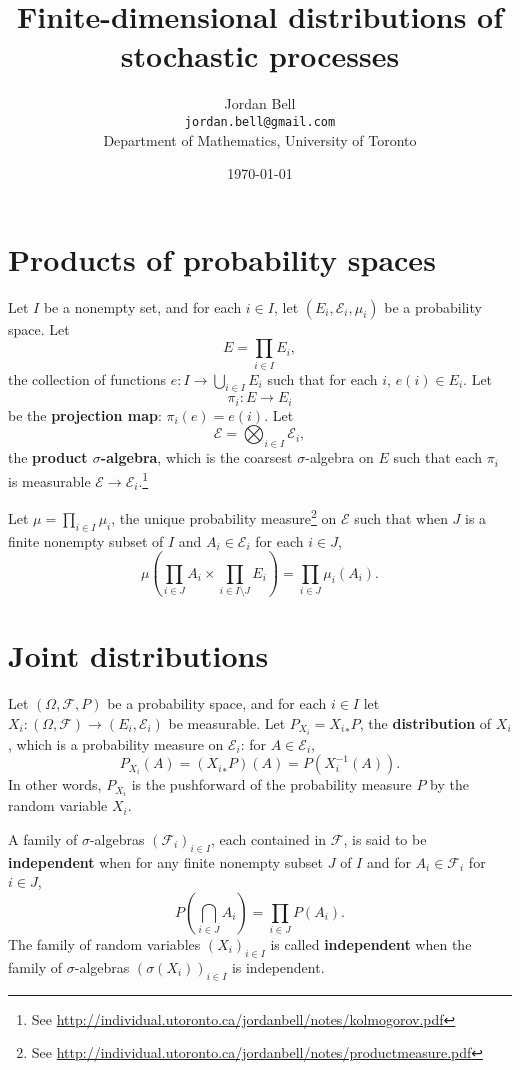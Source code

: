 \documentclass{article}
\theoremstyle{definition}
\begin{document}
\title{Finite-dimensional distributions of stochastic processes}
\author{Jordan Bell\\ \texttt{jordan.bell@gmail.com}\\Department of Mathematics, University of Toronto}
\date{\today}

\maketitle

\section{Products of probability spaces}
Let $I$ be a nonempty set,  and for each
$i \in I$, let $(E_i,\mathscr{E}_i,\mu_i)$ be a probability space.
Let
\[
E=\prod_{i \in I} E_i,
\]
the collection of functions
$e:I \to \bigcup_{i \in I} E_i$ such that for each $i$, $e(i) \in E_i$.
Let
\[
\pi_i:E \to E_i
\]
 be the \textbf{projection map}: $\pi_i(e) = e(i)$. 
Let
\[
\mathscr{E} = \bigotimes_{i \in I} \mathscr{E}_i,
\]
 the \textbf{product $\sigma$-algebra}, which is
the coarsest $\sigma$-algebra on $E$ such that each $\pi_i$ is measurable
$\mathscr{E} \to \mathscr{E}_i$.\footnote{See \url{http://individual.utoronto.ca/jordanbell/notes/kolmogorov.pdf}}

Let $\mu=\prod_{i \in I} \mu_i$, the unique probability measure\footnote{See \url{http://individual.utoronto.ca/jordanbell/notes/productmeasure.pdf}} on $\mathscr{E}$ such that when $J$ is a   finite nonempty subset of $I$
and $A_i \in \mathscr{E}_i$ for each $i \in J$,
\[
\mu\left( \prod_{i \in J} A_i \times \prod_{i \in I \setminus J} E_i \right) = \prod_{i \in J} \mu_i(A_i).
\]


\section{Joint distributions}
Let $(\Omega,\mathscr{F},P)$ be a probability space, and for each $i \in I$ let
$X_i:(\Omega,\mathscr{F}) \to (E_i,\mathscr{E}_i)$ be measurable.
Let $P_{X_i}={X_i}_*P$, the \textbf{distribution} of $X_i$, which is a probability measure
on $\mathscr{E}_i$: for $A \in \mathscr{E}_i$,
\[
P_{X_i}(A) = ({X_i}_*P)(A) = P(X_i^{-1}(A)).
\]
In other words, $P_{X_i}$ is the pushforward of the probability measure $P$ by the random variable $X_i$.

A family of $\sigma$-algebras $(\mathscr{F}_i)_{i \in I}$, each contained
in $\mathscr{F}$, is said to be \textbf{independent} when
for any finite nonempty subset $J$ of $I$ and  for $A_i \in \mathscr{F}_i$ for $i \in J$,
\[
P\left( \bigcap_{i \in J} A_i \right) = \prod_{i \in J} P(A_i).
\]
The family of random variables $(X_i)_{i \in I}$ is called \textbf{independent} when
the family of $\sigma$-algebras $(\sigma(X_i))_{i \in I}$ is independent. 
\end{document}
